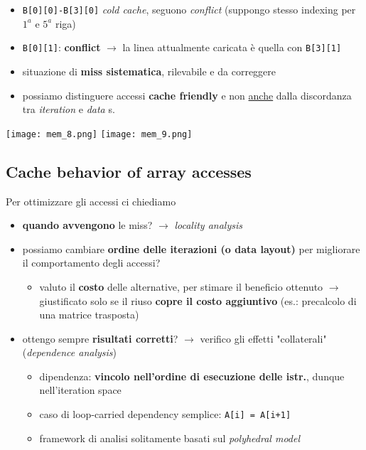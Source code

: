 \begin{example}[frametitle={Dall'esempio: cache miss per accessi ad \lstinline|B|}]

  \noindent\begin{minipage}[c]{.7\textwidth}
    \begin{itemize}
      \item \lstinline|B[0][0]-B[3][0]| \textit{cold cache}, seguono \textit{conflict} (suppongo stesso indexing per $1^{a}$ e $5^{a}$ riga)
      \item \lstinline|B[0][1]|: \textbf{conflict} $\rightarrow$ la linea attualmente caricata \`e quella con \lstinline|B[3][1]|
      \item situazione di \textbf{miss sistematica}, rilevabile e da correggere
      \item possiamo distinguere accessi \textbf{cache friendly} e non \underline{anche} dalla discordanza tra \textit{iteration} e \textit{data} s.
    \end{itemize}
  \end{minipage}
  \begin{minipage}[c]{.3\textwidth}
    \centering
  \texttt{[image: mem\_8.png]}
  \texttt{[image: mem\_9.png]}
  \end{minipage}
\end{example}

\subsection{Cache behavior of array accesses}

Per ottimizzare gli accessi ci chiediamo 
\begin{itemize}
  \item \textbf{quando avvengono} le miss? $\rightarrow$ \textit{locality analysis}
  \item possiamo cambiare \textbf{ordine delle iterazioni (o data layout)} per migliorare il comportamento degli accessi? 
    \begin{itemize}
      \item valuto il \textbf{costo} delle alternative, per stimare il beneficio ottenuto $\rightarrow$ giustificato solo se il riuso \textbf{copre il costo aggiuntivo} (es.: precalcolo di una matrice trasposta) 
    \end{itemize}
  \item ottengo sempre \textbf{risultati corretti}? $\rightarrow$ verifico gli effetti "collaterali" (\textit{dependence analysis})
    \begin{itemize}
      \item dipendenza: \textbf{vincolo nell'ordine di esecuzione delle istr.}, dunque nell'iteration space
    \item caso di loop-carried dependency semplice: \lstinline|A[i] = A[i+1]|
      \item framework di analisi solitamente basati sul \textit{polyhedral model}
    \end{itemize}
\end{itemize}

